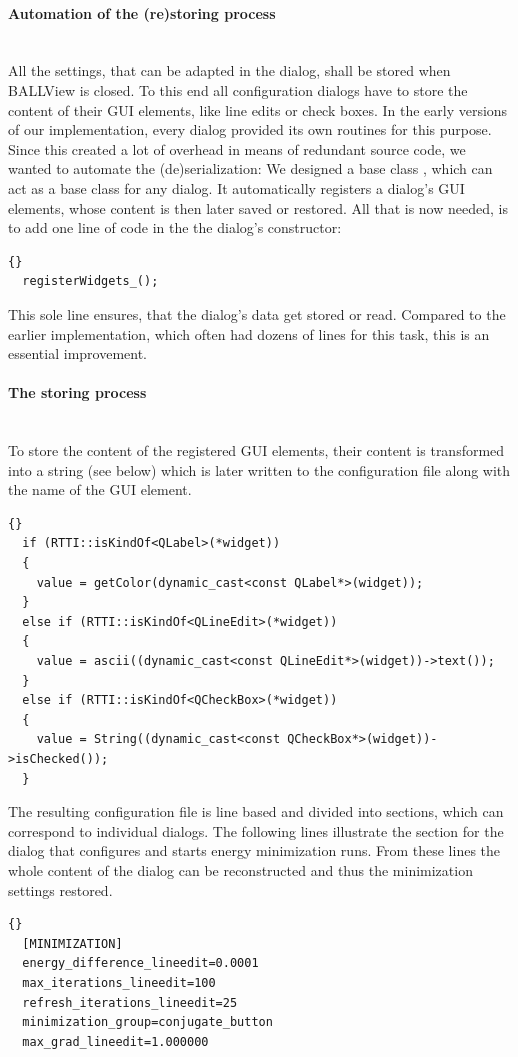 \paragraph{Automation of the (re)storing process}
\hspace*{\fill}\\
All the settings, that can be adapted in the  dialog, shall be 
stored when BALLView is closed.
To this end all configuration dialogs have to store the content of their GUI elements,
like line edits or check boxes.
In the early versions of our implementation, every dialog provided its
own routines for this purpose.
Since this created a lot of overhead in means of redundant source code,
we wanted to automate the (de)serialization:
We designed a base class , which can act as a base class for any dialog.
It automatically registers a dialog's GUI elements, whose content is then later
saved or restored.
All that is now needed, is to add one line of code in the 
the dialog's constructor:
\begin{lstlisting}{}
  registerWidgets_();
\end{lstlisting}

This sole line ensures, that the dialog's data get stored or read.
Compared to the earlier implementation, which often had dozens of lines
for this task, this is an essential improvement.

\paragraph{The storing process}
\hspace*{\fill}\\
To store the content of the registered GUI elements, their content
is transformed into a string (see below) which is later written to the configuration
file along with the name of the GUI element.

\begin{lstlisting}{}
  if (RTTI::isKindOf<QLabel>(*widget))
  {
  	value = getColor(dynamic_cast<const QLabel*>(widget));
  }
  else if (RTTI::isKindOf<QLineEdit>(*widget))
  {
    value = ascii((dynamic_cast<const QLineEdit*>(widget))->text());
  }
  else if (RTTI::isKindOf<QCheckBox>(*widget))
  {
    value = String((dynamic_cast<const QCheckBox*>(widget))->isChecked());
  }
\end{lstlisting}

The resulting configuration file is line based and divided into sections,
which can correspond to individual dialogs. The following lines illustrate
the section for the dialog that configures and starts energy minimization runs.
From these lines the whole content of the dialog can be reconstructed and thus the 
minimization settings restored.
\begin{lstlisting}{}
  [MINIMIZATION]
  energy_difference_lineedit=0.0001
  max_iterations_lineedit=100
  refresh_iterations_lineedit=25
  minimization_group=conjugate_button
  max_grad_lineedit=1.000000
\end{lstlisting}

